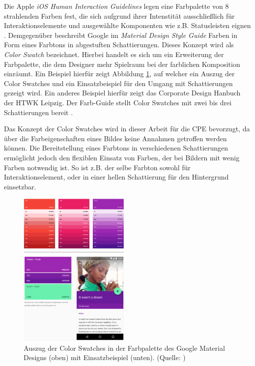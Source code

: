 \documentclass[10pt,a4paper,bibliography=totoc,twocolumn]{scrartcl}
\begin{document}
Die Apple \emph{iOS Human Interaction Guidelines} legen eine Farbpalette von 8 strahlenden Farben fest, die sich aufgrund ihrer Intenstität ausschließlich für Interaktionselemente und ausgewählte Komponenten wie z.B. Statusleisten eignen \citep{ios}. Demgegenüber beschreibt Google im \emph{Material Design Style Guide} Farben in Form eines Farbtons in abgestuften Schattierungen. Dieses Konzept wird als \emph{Color Swatch} bezeichnet. Hierbei handelt es sich um ein Erweiterung der Farbpalette, die dem Designer mehr Spielraum bei der farblichen Komposition einräumt. Ein Beispiel hierfür zeigt Abbildung \ref{fig:swatches}, auf welcher ein Auszug der Color Swatches und ein Einsatzbeispiel für den Umgang mit Schattierungen gezeigt wird. Ein anderes Beispiel hierfür zeigt das Corporate Design Hanbuch der HTWK Leipzig. Der Farb-Guide stellt Color Swatches mit zwei bis drei Schattierungen bereit \citep{htwk}.

Das Konzept der Color Swatches wird in dieser Arbeit für die CPE bevorzugt, da über die Farbeigenschaften eines Bildes keine Annahmen getroffen werden können. Die Bereitstellung eines Farbtons in verschiedenen Schattierungen ermöglicht jedoch den flexiblen Einsatz von Farben, der bei Bildern mit wenig Farben notwendig ist. So ist z.B. der selbe Farbton sowohl für Interaktionselement, oder in einer hellen Schattierung für den Hintergrund einsetzbar. 

\begin{figure}[h]
	\centering
	\includegraphics[width=0.48\textwidth]{img/material_design.png}
	\caption{Auszug der Color Swatches in der Farbpalette des Google Material Designs (oben) mit Einsatzbeispiel (unten). (Quelle: \citep{google})}
	\label{fig:swatches}
\end{figure}
\end{document}
